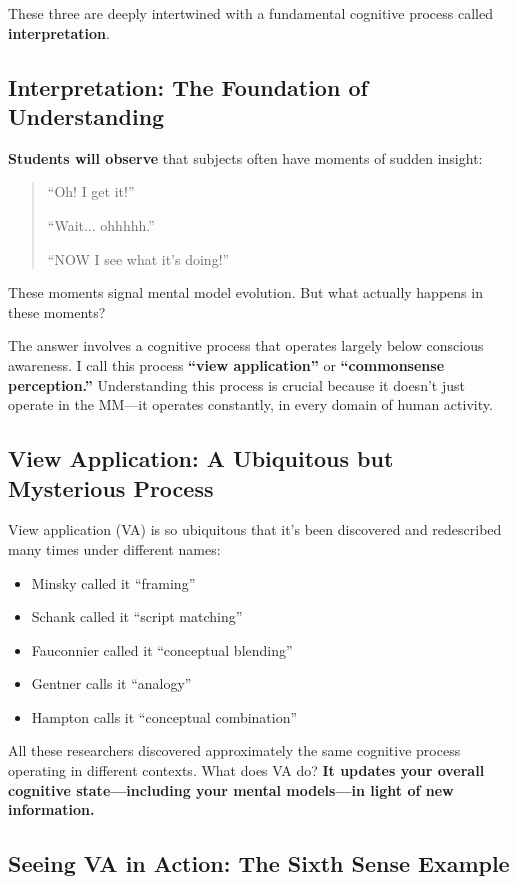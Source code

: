 \documentclass[12pt,letterpaper]{article}
\begin{document}
These three are deeply intertwined with a fundamental cognitive process called \textbf{interpretation}.

\subsection{Interpretation: The Foundation of Understanding}

\textbf{Students will observe} that subjects often have moments of sudden insight:

\begin{quote}
``Oh! I get it!''

``Wait... ohhhhh.''

``NOW I see what it's doing!''
\end{quote}

These moments signal mental model evolution. But what actually happens in these moments?

The answer involves a cognitive process that operates largely below conscious awareness. I call this process \textbf{``view application''} or \textbf{``commonsense perception.''} Understanding this process is crucial because it doesn't just operate in the MM—it operates constantly, in every domain of human activity.

\subsection{View Application: A Ubiquitous but Mysterious Process}

View application (VA) is so ubiquitous that it's been discovered and redescribed many times under different names:

\begin{itemize}
\item Minsky called it ``framing''
\item Schank called it ``script matching''
\item Fauconnier called it ``conceptual blending''
\item Gentner calls it ``analogy''
\item Hampton calls it ``conceptual combination''
\end{itemize}

All these researchers discovered approximately the same cognitive process operating in different contexts. What does VA do? \textbf{It updates your overall cognitive state—including your mental models—in light of new information.}

\subsection{Seeing VA in Action: The Sixth Sense Example}
\end{document}
